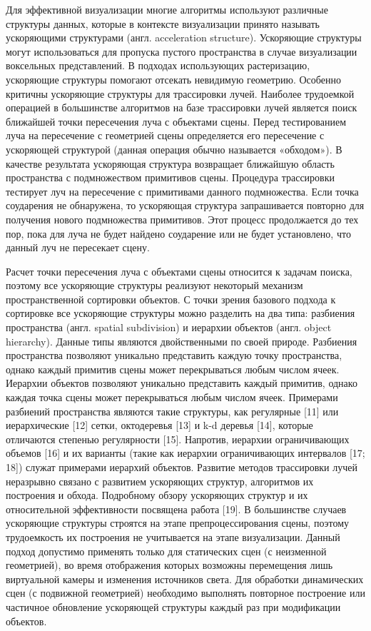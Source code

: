Для эффективной визуализации многие алгоритмы используют различные структуры данных, которые в контексте визуализации принято называть ускоряющими структурами (англ. acceleration structure). Ускоряющие структуры могут использоваться для пропуска пустого пространства в случае визуализации воксельных представлений. В подходах использующих растеризацию, ускоряющие структуры помогают отсекать невидимую геометрию. Особенно критичны ускоряющие структуры для трассировки лучей. Наиболее трудоемкой операцией в большинстве алгоритмов на базе трассировки лучей является поиск ближайшей точки пересечения луча с объектами сцены. Перед тестированием луча на пересечение с геометрией сцены определяется его пересечение с ускоряющей структурой (данная операция обычно называется «обходом»). В качестве результата ускоряющая структура возвращает ближайшую область пространства с подмножеством примитивов сцены. Процедура трассировки тестирует луч на пересечение с примитивами данного подмножества. Если точка соударения не обнаружена, то ускоряющая структура запрашивается повторно для получения нового подмножества примитивов. Этот процесс продолжается до тех пор, пока для луча не будет найдено соударение или не будет установлено, что данный луч не пересекает сцену.

Расчет точки пересечения луча с объектами сцены относится к задачам поиска, поэтому все ускоряющие структуры реализуют некоторый механизм пространственной сортировки объектов. С точки зрения базового подхода к сортировке все ускоряющие структуры можно разделить на два типа: разбиения пространства (англ. spatial subdivision) и иерархии объектов (англ. object hierarchy). Данные типы являются двойственными по своей природе. Разбиения пространства позволяют уникально представить каждую точку пространства, однако каждый примитив сцены может перекрываться любым числом ячеек. Иерархии объектов позволяют уникально представить каждый примитив, однако каждая точка сцены может перекрываться любым числом ячеек. Примерами разбиений пространства являются такие структуры, как регулярные [11] или иерархические [12] сетки, октодеревья [13] и k-d деревья [14], которые отличаются степенью регулярности [15]. Напротив, иерархии ограничивающих объемов [16] и их варианты (такие как иерархии ограничивающих интервалов [17; 18]) служат примерами иерархий объектов. Развитие методов трассировки лучей неразрывно связано с развитием ускоряющих структур, алгоритмов их построения и обхода. Подробному обзору ускоряющих структур и их относительной эффективности посвящена работа [19].
В большинстве случаев ускоряющие структуры строятся на этапе препроцессирования сцены, поэтому трудоемкость их построения не учитывается на этапе визуализации. Данный подход допустимо применять только для статических сцен (с неизменной геометрией), во время отображения которых возможны перемещения лишь виртуальной камеры и изменения источников света. Для обработки динамических сцен (с подвижной геометрией) необходимо выполнять повторное построение или частичное обновление ускоряющей структуры каждый раз при модификации объектов.

